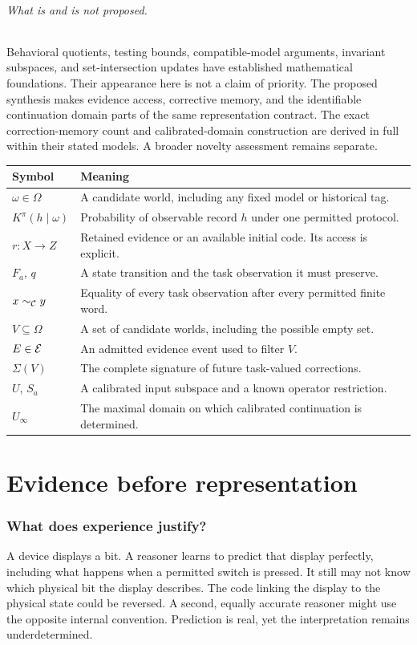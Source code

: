 \documentclass[11pt,letterpaper]{article}
\theoremstyle{plain}
\theoremstyle{definition}
\begin{document}
\paragraph{What is and is not proposed.}
Behavioral quotients, testing bounds, compatible-model arguments, invariant subspaces, and set-intersection updates have established mathematical foundations. Their appearance here is not a claim of priority. The proposed synthesis makes evidence access, corrective memory, and the identifiable continuation domain parts of the same representation contract. The exact correction-memory count and calibrated-domain construction are derived in full within their stated models. A broader novelty assessment remains separate.

\begin{center}\small
\begin{tabularx}{\textwidth}{@{}lX@{}}\toprule
Symbol & Meaning\\\midrule
$\omega\in\Omega$ & A candidate world, including any fixed model or historical tag.\\
$K^\pi(h\mid\omega)$ & Probability of observable record $h$ under one permitted protocol.\\
$r:X\to Z$ & Retained evidence or an available initial code. Its access is explicit.\\
$F_a$, $q$ & A state transition and the task observation it must preserve.\\
$x\sim_{\mathcal C}y$ & Equality of every task observation after every permitted finite word.\\
$V\subseteq\Omega$ & A set of candidate worlds, including the possible empty set.\\
$E\in\mathcal E$ & An admitted evidence event used to filter $V$.\\
$\Sigma(V)$ & The complete signature of future task-valued corrections.\\
$U$, $S_a$ & A calibrated input subspace and a known operator restriction.\\
$U_\infty$ & The maximal domain on which calibrated continuation is determined.\\\bottomrule
\end{tabularx}\end{center}
\clearpage{}
\part{Evidence before representation}
\section{What does experience justify?}\label{sec:introduction}
A device displays a bit. A reasoner learns to predict that display perfectly, including what happens when a permitted switch is pressed. It still may not know which physical bit the display describes. The code linking the display to the physical state could be reversed. A second, equally accurate reasoner might use the opposite internal convention. Prediction is real, yet the interpretation remains underdetermined.
\end{document}
